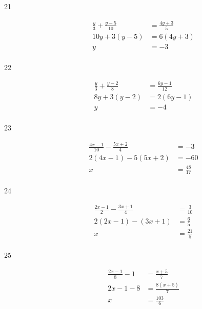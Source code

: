 \documentclass[letterpaper]{exam}
\begin{document}
\begin{description}
      \item[21] 
        \begin{align*}
          \frac{y}{3} + \frac{y - 5}{10} & = \frac{4y + 3}{5} \\
          10y + 3(y - 5)                 & = 6 (4y + 3) \\
          y                              & = \boxed{ -3 } \\
        \end{align*}

      \item[22] 
        \begin{align*}
          \frac{y}{3} + \frac{y - 2}{8} & = \frac{6y - 1}{12} \\
          8y + 3(y - 2)                 & = 2(6y - 1) \\
          y                             & = \boxed{ -4 } \\
        \end{align*}

      \item[23] 
        \begin{align*}
          \frac{4x - 1}{10} - \frac{5x + 2}{4} & = -3 \\
          2(4x - 1) - 5(5x + 2)                & = -60 \\
          x                                    & = \boxed{ \frac{48}{17} } \\
        \end{align*}

      \item[24] 
        \begin{align*}
          \frac{2x - 1}{2} - \frac{3x + 1}{4} & = \frac{3}{10} \\
          2 (2x - 1) - (3x + 1)               & = \frac{6}{5} \\
          x                                   & = \boxed{ \frac{21}{5} } \\
        \end{align*}

      \item[25] 
        \begin{align*}
          \frac{2x - 1}{8} - 1 & = \frac{x + 5}{7} \\
          2x - 1 - 8           & = \frac{8(x + 5)}{7} \\
          x                    & = \boxed{ \frac{103}{6} } \\
        \end{align*}


\end{description}
\end{document}
